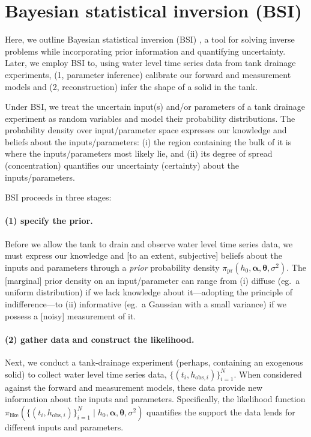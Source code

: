 \documentclass[openacc]{rsproca_new}%
\newcommand\thedata {$\{(t_i,h_{\text{obs}, i})\}_{i=1}^{N}$\xspace}
\newcommand\thedatanomath {\{(t_i,h_{\text{obs}, i})\}_{i=1}^{N}}
\begin{document}
\section{Bayesian statistical inversion (BSI)} \label{sec:bsi}
Here, we outline Bayesian statistical inversion (BSI)  \cite{calvetti2018inverse,waqar2023tutorial,kaipio2006statistical,dashti2013bayesian}, a tool for solving inverse problems while incorporating prior information and quantifying uncertainty. 
Later, we employ BSI to, using water level time series data from tank drainage experiments,  
(1, parameter inference) calibrate our forward and measurement models and 
(2, reconstruction) infer the shape of a solid in the tank.

Under BSI, we treat the uncertain input(s) and/or parameters of a tank drainage experiment as random variables and model their probability distributions.
The probability density over input/parameter space expresses our knowledge and beliefs about the inputs/parameters: 
(i) the region containing the bulk of it is where the inputs/parameters most likely lie, and (ii) its degree of spread (concentration) quantifies our uncertainty (certainty) about the inputs/parameters. 


BSI proceeds in three stages:

\vspace{-\baselineskip}
\paragraph{(1) specify the prior.}
Before we allow the tank to drain and observe water level time series data, we must express our knowledge and [to an extent, subjective] beliefs about the inputs and parameters through a \emph{prior} probability density $\pi_{\text{pr}}(h_0, \boldsymbol \alpha, \boldsymbol \theta, \sigma^2)$.
The [marginal] prior density on an input/parameter can range from 
(i) diffuse (eg.\ a uniform distribution) if we lack knowledge about it---adopting the principle of indifference---to 
(ii) informative (eg.\ a Gaussian with a small variance) if we possess a [noisy] measurement of it. 
\cite{van2021bayesian}

\vspace{-\baselineskip}
\paragraph{(2) gather data and construct the likelihood.}
Next, we conduct a tank-drainage experiment (perhaps, containing an exogenous solid) to collect water level time series data, \thedata. 
When considered against the forward and measurement models, these data provide new information about the inputs and parameters. Specifically, the likelihood function $\pi_{\text{like}}(\thedatanomath \mid h_0,\boldsymbol  \alpha, \boldsymbol \theta, \sigma^2 )$ quantifies the support the data lends for different inputs and parameters.
\end{document}
